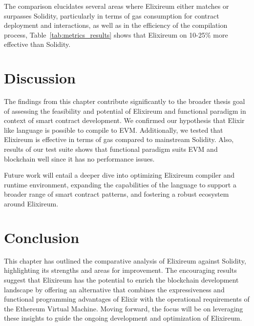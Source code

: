 The comparison elucidates several areas where Elixireum either matches or surpasses Solidity, particularly in terms of gas consumption for contract deployment and interactions, as well as in the efficiency of the compilation process, Table~\ref{tab:metrics_results} shows that Elixireum on 10-25\% more effective than Solidity.

\section{Discussion}
\label{sec:discussion}


The findings from this chapter contribute significantly to the broader thesis goal of assessing the feasibility and potential of Elixireum and functional paradigm in context of smart contract development. We confirmed our hypothesis that Elixir like language is possible to compile to EVM. Additionally, we tested that Elixireum is effective in terms of gas compared to mainstream Solidity. Also, results of our test suite shows that functional paradigm suits EVM and blockchain well since it has no performance issues.

Future work will entail a deeper dive into optimizing Elixireum compiler and runtime environment, expanding the capabilities of the language to support a broader range of smart contract patterns, and fostering a robust ecosystem around Elixireum.

\section{Conclusion}
\label{sec:conclusion}

This chapter has outlined the comparative analysis of Elixireum against Solidity, highlighting its strengths and areas for improvement. The encouraging results suggest that Elixireum has the potential to enrich the blockchain development landscape by offering an alternative that combines the expressiveness and functional programming advantages of Elixir with the operational requirements of the Ethereum Virtual Machine. Moving forward, the focus will be on leveraging these insights to guide the ongoing development and optimization of Elixireum.